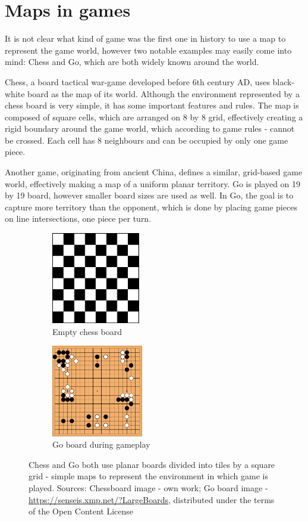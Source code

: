 \documentclass[12pt]{report}
\begin{document}
\section{Maps in games} 

It is not clear what kind of game was the first one in history to use a map to represent the game world, however two notable examples may easily come into mind: Chess and Go, which are both widely known around the world. 

Chess, a board tactical war-game developed before 6th century AD, uses black-white board as the map of its world. Although the environment represented by a chess board is very simple, it has some important features and rules. The map is composed of square cells, which are arranged on 8 by 8 grid, effectively creating a rigid boundary around the game world, which according to game rules - cannot be crossed. Each cell has 8 neighbours and can be occupied by only one game piece.

Another game, originating from ancient China, defines a similar, grid-based game world, effectively making a map of a uniform planar territory. Go is played on 19 by 19 board, however smaller board sizes are used as well. In Go, the goal is to capture more territory than the opponent, which is done by placing game pieces on line intersections, one piece per turn.


\begin{figure}[H]
	\centering
	\begin{subfigure}[t]{0.4\linewidth}
		\centering
		\includegraphics[height=4cm]{images/chessboard}
		\caption{Empty chess board} 
	\end{subfigure} \hspace{1em}
	\hfill
	\begin{subfigure}[t]{0.4\linewidth}
		\centering
		\includegraphics[height=4cm]{images/goboard}
		\caption{Go board during gameplay} 
	\end{subfigure} \hspace{1em} 
	\caption{Chess and Go both use planar boards divided into tiles by a square grid - simple maps to represent the environment in which game is played. Sources: Chessboard image - own work; Go board image - \url{https://senseis.xmp.net/?LargeBoards}, distributed under the terms of the Open Content License }
	\label{fig:neighborhood_types}
\end{figure}
 
\end{document}
